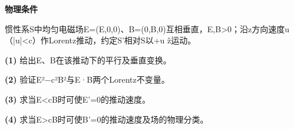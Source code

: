 \textbf{物理条件}\par 惯性系S中均匀电磁场E=(E,0,0)、B=(0,B,0)互相垂直，E,B>0；沿z方向速度u（|u|<c）作Lorentz推动，约定S'相对S以+u ẑ运动。
\par\noindent\textbf{(1)} 给出E、B在该推动下的平行及垂直变换。
\par\noindent\textbf{(2)} 验证E²−c²B²与E·B两个Lorentz不变量。
\par\noindent\textbf{(3)} 求当E<cB时可使E'=0的推动速度。
\par\noindent\textbf{(4)} 求当E>cB时可使B'=0的推动速度及场的物理分类。
